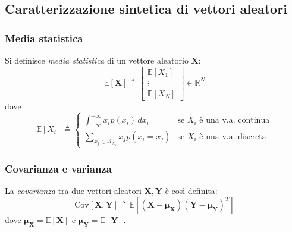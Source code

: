 \subsection{Caratterizzazione sintetica di vettori aleatori}


\subsubsection{Media statistica}


\begin{Mybox}
    \begin{definizione}
     Si definisce \emph{media statistica} di un vettore aleatorio $\mathbf{X}$:
     \begin{equation}
        \mathbb{E}[\mathbf{X}]\triangleq
            \begin{bmatrix}
            \mathbb{E}[X_1] \\
            \vdots \\
            \mathbb{E}[X_N]
            \end{bmatrix}
        \in \mathbb{R}^N
    \end{equation}
    dove
    \begin{equation}
        \mathbb{E}[X_i]\triangleq  
        \begin{cases}
            \int_{-\infty}^{+\infty}x_ip(x_i) \,dx_i & \text{se $X_i$ è una v.a.\ continua} \\
            \sum\limits_{x_j\in\mathcal{A}_{X_i}} x_jp(x_i=x_j)   & \text{se $X_i$ è una v.a.\ discreta} 
        \end{cases} 
    \end{equation}
    \end{definizione}
\end{Mybox}


\subsubsection{Covarianza e varianza}


\begin{Mybox}
    \begin{definizione}[Covarianza]
     La \emph{covarianza} tra due vettori aleatori $\mathbf{X},\mathbf{Y}$ è così definita: 
     \begin{equation}
     \text{Cov}[\mathbf{X},\mathbf{Y}] \triangleq\mathbb{E}[(\mathbf{X}-\bm{\mu}_{\mathbf{X}})(\mathbf{Y}-\bm{\mu}_{\mathbf{Y}})^T]\label{eq:covariance}
     \end{equation}
     dove $\bm{\mu}_{\mathbf{X}}=\mathbb{E}[\mathbf{X}]$ e $\bm{\mu}_{\mathbf{Y}}=\mathbb{E}[\mathbf{Y}]$.
    \end{definizione}
\end{Mybox}

